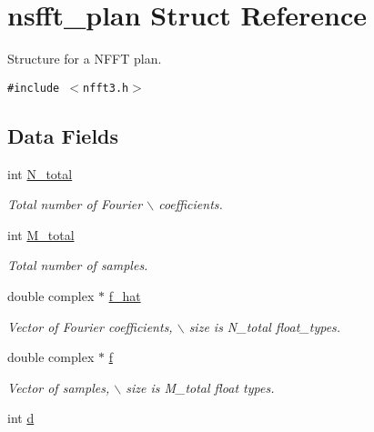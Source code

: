 \hypertarget{structnsfft__plan}{
\section{nsfft\_\-plan Struct Reference}
\label{structnsfft__plan}
}
Structure for a NFFT plan.  


{\tt \#include $<$nfft3.h$>$}

\subsection*{Data Fields}
\begin{CompactItemize}
\item 
\hypertarget{structnsfft__plan_o0}{
int \hyperlink{structnsfft__plan_o0}{N\_\-total}}
\label{structnsfft__plan_o0}

\begin{CompactList}\small\item\em Total number of Fourier $\backslash$ coefficients. \item\end{CompactList}\item 
\hypertarget{structnsfft__plan_o1}{
int \hyperlink{structnsfft__plan_o1}{M\_\-total}}
\label{structnsfft__plan_o1}

\begin{CompactList}\small\item\em Total number of samples. \item\end{CompactList}\item 
\hypertarget{structnsfft__plan_o2}{
double complex $\ast$ \hyperlink{structnsfft__plan_o2}{f\_\-hat}}
\label{structnsfft__plan_o2}

\begin{CompactList}\small\item\em Vector of Fourier coefficients, $\backslash$ size is N\_\-total float\_\-types. \item\end{CompactList}\item 
\hypertarget{structnsfft__plan_o3}{
double complex $\ast$ \hyperlink{structnsfft__plan_o3}{f}}
\label{structnsfft__plan_o3}

\begin{CompactList}\small\item\em Vector of samples, $\backslash$ size is M\_\-total float types. \item\end{CompactList}\item 
\hypertarget{structnsfft__plan_o4}{
int \hyperlink{structnsfft__plan_o4}{d}}
\label{structnsfft__plan_o4}


\end{CompactItemize}
